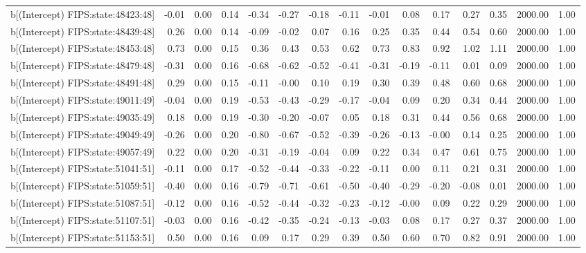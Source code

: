 \begin{table}[ht]
\begin{tabular}{rrrrrrrrrrrrrrr}
  b[(Intercept) FIPS:state:48423:48] & -0.01 & 0.00 & 0.14 & -0.34 & -0.27 & -0.18 & -0.11 & -0.01 & 0.08 & 0.17 & 0.27 & 0.35 & 2000.00 & 1.00 \\ 
  b[(Intercept) FIPS:state:48439:48] & 0.26 & 0.00 & 0.14 & -0.09 & -0.02 & 0.07 & 0.16 & 0.25 & 0.35 & 0.44 & 0.54 & 0.60 & 2000.00 & 1.00 \\ 
  b[(Intercept) FIPS:state:48453:48] & 0.73 & 0.00 & 0.15 & 0.36 & 0.43 & 0.53 & 0.62 & 0.73 & 0.83 & 0.92 & 1.02 & 1.11 & 2000.00 & 1.00 \\ 
  b[(Intercept) FIPS:state:48479:48] & -0.31 & 0.00 & 0.16 & -0.68 & -0.62 & -0.52 & -0.41 & -0.31 & -0.19 & -0.11 & 0.01 & 0.09 & 2000.00 & 1.00 \\ 
  b[(Intercept) FIPS:state:48491:48] & 0.29 & 0.00 & 0.15 & -0.11 & -0.00 & 0.10 & 0.19 & 0.30 & 0.39 & 0.48 & 0.60 & 0.68 & 2000.00 & 1.00 \\ 
  b[(Intercept) FIPS:state:49011:49] & -0.04 & 0.00 & 0.19 & -0.53 & -0.43 & -0.29 & -0.17 & -0.04 & 0.09 & 0.20 & 0.34 & 0.44 & 2000.00 & 1.00 \\ 
  b[(Intercept) FIPS:state:49035:49] & 0.18 & 0.00 & 0.19 & -0.30 & -0.20 & -0.07 & 0.05 & 0.18 & 0.31 & 0.44 & 0.56 & 0.68 & 2000.00 & 1.00 \\ 
  b[(Intercept) FIPS:state:49049:49] & -0.26 & 0.00 & 0.20 & -0.80 & -0.67 & -0.52 & -0.39 & -0.26 & -0.13 & -0.00 & 0.14 & 0.25 & 2000.00 & 1.00 \\ 
  b[(Intercept) FIPS:state:49057:49] & 0.22 & 0.00 & 0.20 & -0.31 & -0.19 & -0.04 & 0.09 & 0.22 & 0.34 & 0.47 & 0.61 & 0.75 & 2000.00 & 1.00 \\ 
  b[(Intercept) FIPS:state:51041:51] & -0.11 & 0.00 & 0.17 & -0.52 & -0.44 & -0.33 & -0.22 & -0.11 & 0.00 & 0.11 & 0.21 & 0.31 & 2000.00 & 1.00 \\ 
  b[(Intercept) FIPS:state:51059:51] & -0.40 & 0.00 & 0.16 & -0.79 & -0.71 & -0.61 & -0.50 & -0.40 & -0.29 & -0.20 & -0.08 & 0.01 & 2000.00 & 1.00 \\ 
  b[(Intercept) FIPS:state:51087:51] & -0.12 & 0.00 & 0.16 & -0.52 & -0.44 & -0.32 & -0.23 & -0.12 & -0.00 & 0.09 & 0.22 & 0.29 & 2000.00 & 1.00 \\ 
  b[(Intercept) FIPS:state:51107:51] & -0.03 & 0.00 & 0.16 & -0.42 & -0.35 & -0.24 & -0.13 & -0.03 & 0.08 & 0.17 & 0.27 & 0.37 & 2000.00 & 1.00 \\ 
  b[(Intercept) FIPS:state:51153:51] & 0.50 & 0.00 & 0.16 & 0.09 & 0.17 & 0.29 & 0.39 & 0.50 & 0.60 & 0.70 & 0.82 & 0.91 & 2000.00 & 1.00 \\ 

\end{tabular}
\end{table}
